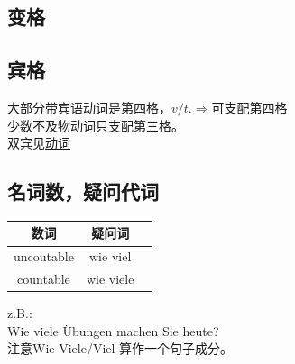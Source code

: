 \subsection{变格}

\subsection{宾格}
大部分带宾语动词是第四格，$v/t. \Rightarrow 可支配第四格$ \\
少数不及物动词只支配第三格。\\
双宾见\hyperref[chap:verb:double_object_order]{动词} \\


\subsection{名词数，疑问代词}
\begin{center}
    \begin{tabular}{|c|c|c|}
        \hline
        \rowcolor{gray}
        数词         & 疑问词       \\
        \hline
        uncoutable & wie viel  \\
        \hline
        countable  & wie viele \\
        \hline
    \end{tabular}
\end{center}
z.B.:\\
Wie viele Übungen machen Sie heute? \\
注意Wie Viele/Viel \sqr[border=true] 算作一个句子成分。


